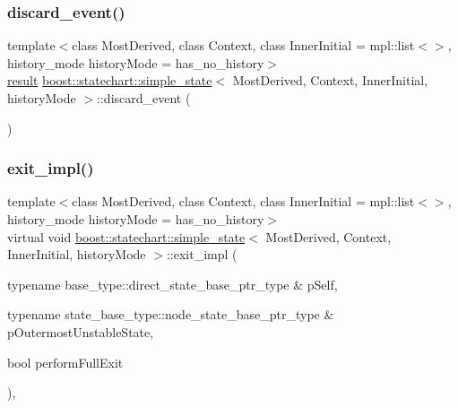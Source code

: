 \mbox{\label{classboost_1_1statechart_1_1simple__state_aba633726b29a7bd07d69429bab4a3a1b}} 
\subsubsection{\texorpdfstring{discard\+\_\+event()}{discard\_event()}}
{\footnotesize\ttfamily template$<$class Most\+Derived, class Context, class Inner\+Initial = mpl\+::list$<$$>$, history\+\_\+mode history\+Mode = has\+\_\+no\+\_\+history$>$ \\
\mbox{\hyperlink{namespaceboost_1_1statechart_abe807f6598b614d6d87bb951ecd92331}{result}} \mbox{\hyperlink{classboost_1_1statechart_1_1simple__state}{boost\+::statechart\+::simple\+\_\+state}}$<$ Most\+Derived, Context, Inner\+Initial, history\+Mode $>$\+::discard\+\_\+event (\begin{DoxyParamCaption}{ }\end{DoxyParamCaption})\hspace{0.3cm}{\ttfamily [inline]}}

\mbox{\label{classboost_1_1statechart_1_1simple__state_a82e8a0fa7183343e0513e97eb704fdee}} 
\subsubsection{\texorpdfstring{exit\+\_\+impl()}{exit\_impl()}\hspace{0.1cm}{\footnotesize\ttfamily [1/2]}}
{\footnotesize\ttfamily template$<$class Most\+Derived, class Context, class Inner\+Initial = mpl\+::list$<$$>$, history\+\_\+mode history\+Mode = has\+\_\+no\+\_\+history$>$ \\
virtual void \mbox{\hyperlink{classboost_1_1statechart_1_1simple__state}{boost\+::statechart\+::simple\+\_\+state}}$<$ Most\+Derived, Context, Inner\+Initial, history\+Mode $>$\+::exit\+\_\+impl (\begin{DoxyParamCaption}\item[{typename base\+\_\+type\+::direct\+\_\+state\+\_\+base\+\_\+ptr\+\_\+type \&}]{p\+Self,  }\item[{typename state\+\_\+base\+\_\+type\+::node\+\_\+state\+\_\+base\+\_\+ptr\+\_\+type \&}]{p\+Outermost\+Unstable\+State,  }\item[{bool}]{perform\+Full\+Exit }\end{DoxyParamCaption})\hspace{0.3cm}{\ttfamily [inline]}, {\ttfamily [virtual]}}

